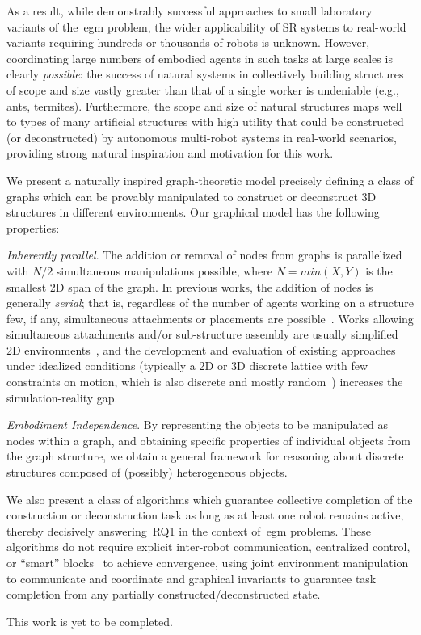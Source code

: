 As a result, while demonstrably successful approaches to small laboratory
variants of the~\gls{egm} problem, the wider applicability of SR systems to
real-world variants requiring hundreds or thousands of robots is unknown.
However, coordinating large numbers of embodied agents in such tasks at large
scales is clearly \emph{possible}: the success of natural systems in
collectively building structures of scope and size vastly greater than that of a
single worker is undeniable (e.g., ants, termites). Furthermore, the scope and
size of natural structures maps well to types of many artificial structures with
high utility that could be constructed (or deconstructed) by autonomous
multi-robot systems in real-world scenarios, providing strong natural
inspiration and motivation for this work.

We present a naturally inspired graph-theoretic model precisely defining a class
of graphs which can be provably manipulated to construct or deconstruct 3D
structures in different environments. Our graphical model has the following
properties:

\emph{Inherently parallel}. The addition or removal of nodes from graphs is
parallelized with $N/2$ simultaneous manipulations possible, where $N=min(X,Y)$
is the smallest 2D span of the graph. In previous works, the addition of nodes
is generally \emph{serial}; that is, regardless of the number of agents working
on a structure few, if any, simultaneous attachments or placements are
possible~\cite{Petersen2011,Werfel2011,Worcester2011}. Works allowing
simultaneous attachments and/or sub-structure assembly are usually simplified 2D
environments~\cite{Meng2008,Zhang2011,Matthey2009}, and the development and
evaluation of existing approaches under idealized conditions (typically a 2D or
3D discrete lattice with few constraints on motion, which is also discrete and
mostly random~\cite{Grushin2006,Theraulaz1995}) increases the simulation-reality
gap.

\emph{Embodiment Independence}. By representing the objects to be manipulated as
nodes within a graph, and obtaining specific properties of individual objects
from the graph structure, we obtain a general framework for reasoning about
discrete structures composed of (possibly) heterogeneous objects.

We also present a class of algorithms which guarantee collective completion of
the construction or deconstruction task as long as at least one robot remains
active, thereby decisively answering~\gls{RQ1} in the context of~\gls{egm}
problems. These algorithms do not require explicit inter-robot communication,
centralized control, or ``smart'' blocks~\cite{Werfel2006} to achieve
convergence, using joint environment manipulation to communicate and coordinate
and graphical invariants to guarantee task completion from any partially
constructed/deconstructed state.

This work is yet to be completed.


